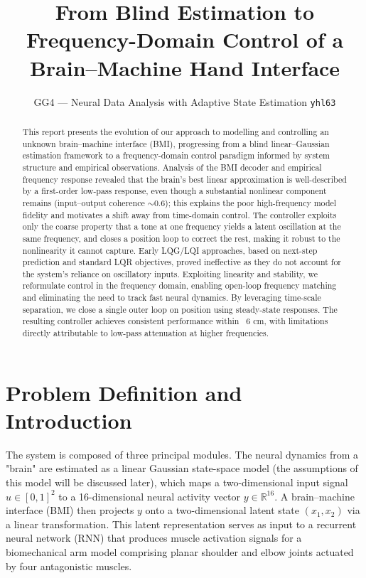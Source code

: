 \documentclass[11pt]{article}
\title{\vspace{-1.3em}\textbf{From Blind Estimation to Frequency-Domain Control of a\\
Brain--Machine Hand Interface}}
\author{GG4 --- Neural Data Analysis with Adaptive State Estimation \quad\textbar\quad \texttt{yhl63}}
\date{\vspace{-0.9em}}
\begin{document}
\maketitle
\vspace{-0.8em}

\begin{abstract}\noindent\small
This report presents the evolution of our approach to modelling and controlling an unknown brain–machine interface (BMI), 
progressing from a blind linear–Gaussian estimation framework to a frequency-domain control paradigm informed by system 
structure and empirical observations. Analysis of the BMI decoder and empirical frequency response revealed that the brain's
best linear approximation is well-described by a first-order low-pass response, even though a substantial nonlinear
component remains (input--output coherence $\sim$0.6); this explains the poor high-frequency model fidelity and motivates
a shift away from time-domain control. The controller exploits only the coarse property that a tone at one frequency yields a 
latent oscillation at the same frequency, and closes a position loop to
correct the rest, making it robust to the nonlinearity it cannot capture. Early LQG/LQI approaches, based on next-step prediction 
and standard LQR objectives, proved ineffective as they do not account for the system’s reliance on oscillatory inputs. 
Exploiting linearity and stability, we reformulate control in the frequency domain, enabling open-loop frequency matching 
and eliminating the need to track fast neural dynamics. By leveraging time-scale separation, we close a single outer loop 
on position using steady-state responses. The resulting controller achieves consistent performance within ~6 cm, with 
limitations directly attributable to low-pass attenuation at higher frequencies.
\end{abstract}

\vspace{-0.4em}
\section{Problem Definition and Introduction}
The system is composed of three principal modules. The neural dynamics from a "brain"
are estimated as a linear Gaussian state-space model (the assumptions of this model will
be discussed later), which maps a two-dimensional input signal $u \in [0,1]^2$ to a 16-dimensional neural
activity vector $y \in \mathbb{R}^{16}$. A brain--machine interface (BMI)
then projects $y$ onto a two-dimensional latent state $(x_1, x_2)$ via a
linear transformation. This latent representation serves as input to a
recurrent neural network (RNN) that produces muscle activation signals for a
biomechanical arm model comprising planar shoulder and elbow joints actuated
by four antagonistic muscles. 
\end{document}
